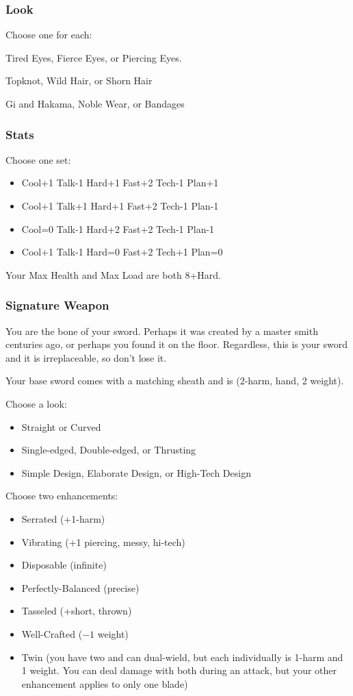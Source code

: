 \subsubsection{Look}

Choose one for each:

Tired Eyes, Fierce Eyes, or Piercing Eyes.

Topknot, Wild Hair, or Shorn Hair

Gi and Hakama, Noble Wear, or Bandages

\subsubsection{Stats}
Choose one set:
\begin{itemize}
\setlength\itemsep{0em}
\item Cool+1 Talk-1 Hard+1 Fast+2 Tech-1 Plan+1
\item Cool+1 Talk+1 Hard+1 Fast+2 Tech-1 Plan-1
\item Cool=0 Talk-1 Hard+2 Fast+2 Tech-1 Plan-1
\item Cool+1 Talk-1 Hard=0 Fast+2 Tech+1 Plan=0
\end{itemize}

Your Max Health and Max Load are both 8+Hard.

\subsubsection{Signature Weapon}
You are the bone of your sword. Perhaps it was created by a master smith centuries ago, or perhaps you found it on the floor. Regardless, this is your sword and it is irreplaceable, so don't lose it.

Your base sword comes with a matching sheath and is (2-harm, hand, 2 weight).

Choose a look:
\begin{itemize}
\item Straight or Curved
\item Single-edged, Double-edged, or Thrusting
\item Simple Design, Elaborate Design, or High-Tech Design
\end{itemize}

Choose two enhancements:
\begin{itemize}
\item Serrated (+1-harm)
\item Vibrating (+1 piercing, messy, hi-tech)
\item Disposable (infinite)
\item Perfectly-Balanced (precise)
\item Tasseled (+short, thrown)
\item Well-Crafted ($-1$ weight)
\item Twin (you have two and can dual-wield, but each individually is 1-harm and 1 weight. You can deal damage with both during an attack, but your other enhancement applies to only one blade)
\end{itemize}

